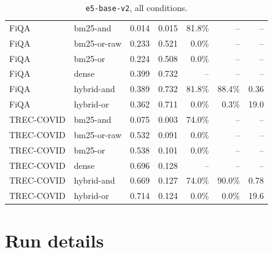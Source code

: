 \documentclass[11pt]{article}
\begin{document}
\begin{table}[p]
\begin{tabular}{llrrrrr}
\midrule
FiQA & bm25-and & 0.014 & 0.015 & 81.8\% & -- & -- \\
FiQA & bm25-or-raw & 0.233 & 0.521 & 0.0\% & -- & -- \\
FiQA & bm25-or & 0.224 & 0.508 & 0.0\% & -- & -- \\
FiQA & dense & 0.399 & 0.732 & -- & -- & -- \\
FiQA & hybrid-and & 0.389 & 0.732 & 81.8\% & 88.4\% & 0.36 \\
FiQA & hybrid-or & 0.362 & 0.711 & 0.0\% & 0.3\% & 19.0 \\
\midrule
TREC-COVID & bm25-and & 0.075 & 0.003 & 74.0\% & -- & -- \\
TREC-COVID & bm25-or-raw & 0.532 & 0.091 & 0.0\% & -- & -- \\
TREC-COVID & bm25-or & 0.538 & 0.101 & 0.0\% & -- & -- \\
TREC-COVID & dense & 0.696 & 0.128 & -- & -- & -- \\
TREC-COVID & hybrid-and & 0.669 & 0.127 & 74.0\% & 90.0\% & 0.78 \\
TREC-COVID & hybrid-or & 0.714 & 0.124 & 0.0\% & 0.0\% & 19.6 \\
\bottomrule
\end{tabular}
\caption{\texttt{e5-base-v2}, all conditions.}
\label{tab:full-e5}
\end{table}

\section{Run details}
\label{app:run}
\end{document}
